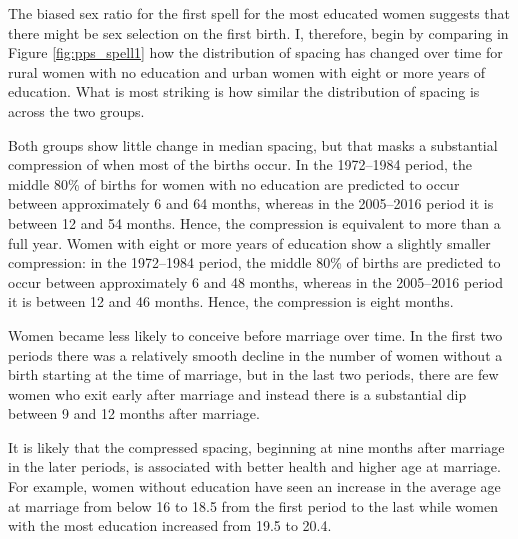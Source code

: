 \documentclass[12pt,letterpaper]{article}
\begin{document}
The biased sex ratio for the first spell for the most educated 
women suggests that there might be sex selection on the first birth.
I, therefore, begin by comparing in Figure \ref{fig:pps_spell1} how the distribution 
of spacing has changed over time for rural women with no education and urban women 
with eight or more years of education.
What is most striking is how similar the distribution of spacing is across the
two groups.

Both groups show little change in median spacing, but that masks a substantial
compression of when most of the births occur.
In the 1972--1984 period, the middle 80\% of births for women with no education 
are predicted to occur between approximately 6 and 64 months, whereas in the 
2005--2016 period it is between 12 and 54 months.
Hence, the compression is equivalent to more than a full year.
Women with eight or more years of education show a slightly smaller compression:
in the 1972--1984 period, the middle 80\% of births are predicted to occur between
approximately 6 and 48 months, whereas in the 2005--2016 period it is between
12 and 46 months.
Hence, the compression is eight months.

Women became less likely to conceive before marriage over time.
In the first two periods there was a relatively smooth decline in the number of
women without a birth starting at the time of marriage, but in the last two
periods, there are few women who exit early after marriage and
instead there is a substantial dip between 9 and 12 months after
marriage.

It is likely that the compressed spacing, beginning at nine months
after marriage in the later periods, is associated with better health
and higher age at marriage.
For example, women without education have seen an increase in the average 
age at marriage from below 16 to 18.5 from the first period to the last 
while women with the most education increased from 19.5 to 20.4.
\end{document}
